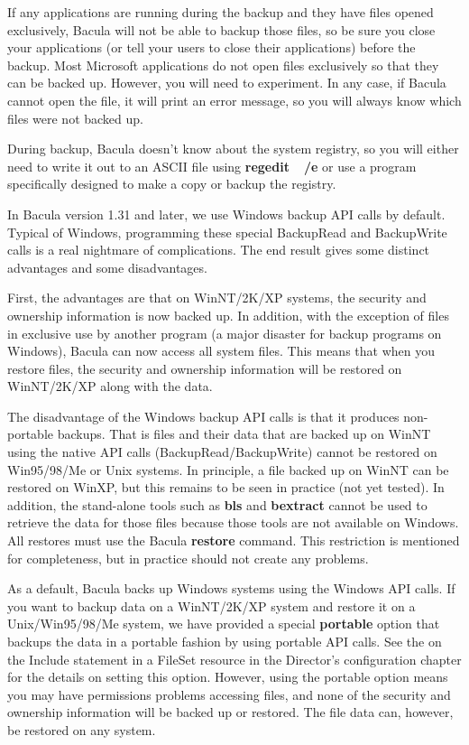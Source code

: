 If any applications are running during the backup and they have files
opened exclusively, Bacula will not be able to backup those files, so be
sure you close your applications (or tell your users to close their
applications) before the backup.  Most Microsoft applications do not open
files exclusively so that they can be backed up.  However, you will need to
experiment.  In any case, if Bacula cannot open the file, it will print an
error message, so you will always know which files were not backed up.

During backup, Bacula doesn't know about the system registry, so you will
either need to write it out to an ASCII file using {\bf regedit~~/e} or use a
program specifically designed to make a copy or backup the registry. 

In Bacula version 1.31 and later, we use Windows backup API calls by
default.  Typical of Windows, programming these special BackupRead and
BackupWrite calls is a real nightmare of complications.  The end result
gives some distinct advantages and some disadvantages.

First, the advantages are that on WinNT/2K/XP systems, the security and
ownership information is now backed up.  In addition, with the exception of
files in exclusive use by another program (a major disaster for backup
programs on Windows), Bacula can now access all system files.  This means
that when you restore files, the security and ownership information will be
restored on WinNT/2K/XP along with the data.

The disadvantage of the Windows backup API calls is that it produces
non-portable backups.  That is files and their data that are backed up on
WinNT using the native API calls (BackupRead/BackupWrite) cannot be
restored on Win95/98/Me or Unix systems.  In principle, a file backed up on
WinNT can be restored on WinXP, but this remains to be seen in practice
(not yet tested).  In addition, the stand-alone tools such as {\bf bls} and
{\bf bextract} cannot be used to retrieve the data for those files because
those tools are not available on Windows.  All restores must use the Bacula
{\bf restore} command.  This restriction is mentioned for completeness, but
in practice should not create any problems.

As a default, Bacula backs up Windows systems using the Windows API calls.
If you want to backup data on a WinNT/2K/XP system and restore it on a
Unix/Win95/98/Me system, we have provided a special {\bf portable} option
that backups the data in a portable fashion by using portable API calls.
See the  on the Include statement in a
FileSet resource in the Director's configuration chapter for the details on
setting this option.  However, using the portable option means you may have
permissions problems accessing files, and none of the security and
ownership information will be backed up or restored.  The file data can,
however, be restored on any system.

